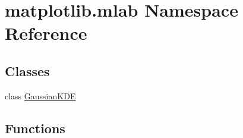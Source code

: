 \hypertarget{namespacematplotlib_1_1mlab}{}\section{matplotlib.\+mlab Namespace Reference}
\label{namespacematplotlib_1_1mlab}
\subsection*{Classes}
\begin{DoxyCompactItemize}
\item 
class \hyperlink{classmatplotlib_1_1mlab_1_1GaussianKDE}{Gaussian\+K\+DE}
\end{DoxyCompactItemize}
\subsection*{Functions}
